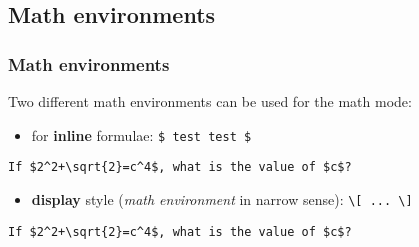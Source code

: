 \subsection{Math environments}
\begin{frame}[fragile]
\frametitle{Math environments}

Two different math environments can be used for the math mode:

\begin{itemize}
	\item for \textbf{inline} formulae: \lstinline|$ test test $|
\end{itemize}

\begin{lstlisting}
If $2^2+\sqrt{2}=c^4$, what is the value of $c$?
\end{lstlisting}

\pause 

\begin{itemize}
	\item \textbf{display} style (\emph{math environment} in narrow sense): \lstinline|\[ ... \]|
\end{itemize}

\begin{lstlisting}
If $2^2+\sqrt{2}=c^4$, what is the value of $c$?
\end{lstlisting}


\end{frame}


